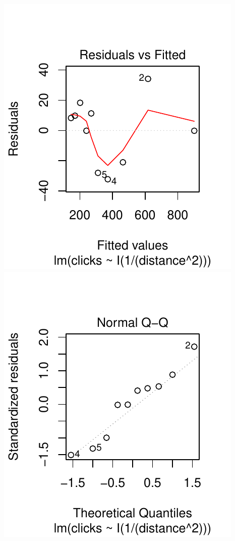 \documentclass[twoside]{book}\usepackage[]{graphicx}\usepackage[]{xcolor}
\makeatletter
\def\maxwidth{ %
  \ifdim\Gin@nat@width>\linewidth
    \linewidth
  \else
    \Gin@nat@width
  \fi
}
\newenvironment{knitrout}{}{} %
\makeatother
\begin{document}
\begin{problem}
\begin{knitrout}
{\centering \includegraphics[width=\maxwidth]{figures/fig-unnamed-chunk-265-1} 
\includegraphics[width=\maxwidth]{figures/fig-unnamed-chunk-265-2} 

}
\end{knitrout}
\end{problem}
\end{document}
